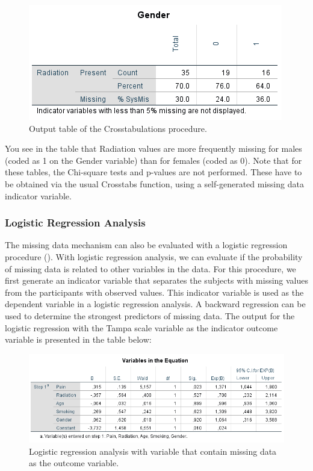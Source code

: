 \documentclass[]{book}
\begin{document}
\begin{figure}

{\centering \includegraphics[width=0.7\linewidth]{images/Crosstabulation} 

}

\caption{Output table of the Crosstabulations procedure.}\label{fig:tab2-8}
\end{figure}

You see in the table that Radiation values are more frequently missing
for males (coded as 1 on the Gender variable) than for females (coded as
0). Note that for these tables, the Chi-square tests and p-values are
not performed. These have to be obtained via the usual Crosstabs
function, using a self-generated missing data indicator variable.

\subsubsection{Logistic Regression
Analysis}\label{logistic-regression-analysis}

The missing data mechanism can also be evaluated with a logistic
regression procedure (\citet{Ridout1991}). With logistic regression
analysis, we can evaluate if the probability of missing data is related
to other variables in the data. For this procedure, we first generate an
indicator variable that separates the subjects with missing values from
the participants with observed values. This indicator variable is used
as the dependent variable in a logistic regression analysis. A backward
regression can be used to determine the strongest predictors of missing
data. The output for the logistic regression with the Tampa scale
variable as the indicator outcome variable is presented in the table
below:

\begin{figure}

{\centering \includegraphics[width=0.9\linewidth]{images/tab2.6} 

}

\caption{Logistic regression analysis with variable that contain missing data as the outcome variable.}\label{fig:tab2-6}
\end{figure}
\end{document}
